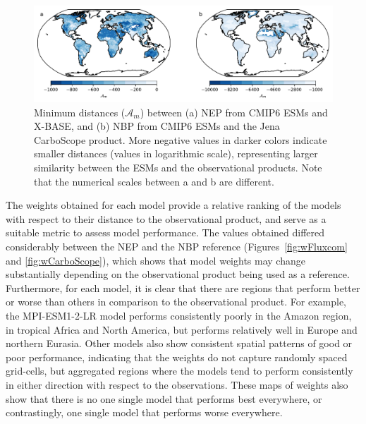 \documentclass[gmd, manuscript]{copernicus}
\begin{document}
\begin{figure}[t]
   \centering
   \includegraphics[width=14cm]{Figures/Amin.pdf} %
   \caption{Minimum distances ($\mathcal{A}_m$) between (a) NEP from CMIP6 ESMs and X-BASE, and (b) NBP from CMIP6 ESMs and the Jena CarboScope product. More negative values in darker colors indicate smaller distances (values in logarithmic scale), representing larger similarity between the ESMs and the observational products. Note that the numerical scales between a and b are different.}
   \label{fig:Am}
\end{figure}

The weights obtained for each model provide a relative ranking of the models with respect to their distance to the observational product, and serve as a suitable metric to assess model performance. 
The values obtained differed considerably between the NEP and the NBP reference (Figures~\ref{fig:wFluxcom} and \ref{fig:wCarboScope}), which shows that model weights may change substantially depending on the observational product being used as a reference.
Furthermore, for each model, it is clear that there are regions that perform better or worse than others in comparison to the observational product. For example, the MPI-ESM1-2-LR model performs consistently poorly in the Amazon region, in tropical Africa and North America, but performs relatively well in Europe and northern Eurasia. Other models also show consistent spatial patterns of good or poor performance, indicating that the weights do not capture randomly spaced grid-cells, but aggregated regions where the models tend to perform consistently in either direction with respect to the observations. 
These maps of weights also show that there is no one single model that performs best everywhere, or contrastingly, one single model that performs worse everywhere. 
\end{document}
